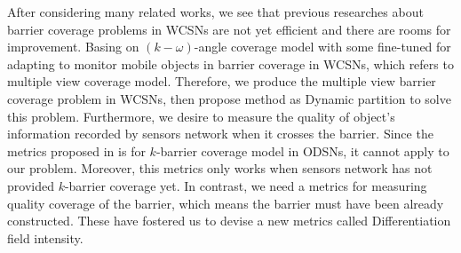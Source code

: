 After considering many related works, we see that previous researches about barrier coverage problems in WCSNs are not yet efficient and there are rooms for improvement. Basing on $(k-\omega)$-angle coverage model \cite{xu2016minimum} with some fine-tuned for adapting to monitor mobile objects in barrier coverage in WCSNs, which refers to multiple view coverage model. Therefore, we produce the multiple view barrier coverage problem in WCSNs, then propose method as Dynamic partition to solve this problem. Furthermore, we desire to measure the quality of object's information recorded by sensors network when it crosses the barrier. Since the metrics proposed in \cite{chen2008measuring} is for $k$-barrier coverage model in ODSNs, it cannot apply to our problem. Moreover, this metrics only works when sensors network has not provided $k$-barrier coverage yet. In contrast, we need a metrics for measuring quality coverage of the barrier, which means the barrier must have been already constructed. These have fostered us to devise a new metrics called Differentiation field intensity.


